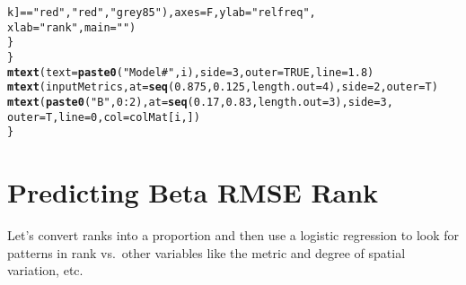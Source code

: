 \documentclass{article}\usepackage[]{graphicx}\usepackage[]{color}
\makeatletter
\newcommand{\hlnum}[1]{\textcolor[rgb]{0.686,0.059,0.569}{#1}}%
\newcommand{\hlstr}[1]{\textcolor[rgb]{0.192,0.494,0.8}{#1}}%
\newcommand{\hlopt}[1]{\textcolor[rgb]{0,0,0}{#1}}%
\newcommand{\hlstd}[1]{\textcolor[rgb]{0.345,0.345,0.345}{#1}}%
\newcommand{\hlkwc}[1]{\textcolor[rgb]{0.333,0.667,0.333}{#1}}%
\newcommand{\hlkwd}[1]{\textcolor[rgb]{0.737,0.353,0.396}{\textbf{#1}}}%
\newenvironment{kframe}{%
 \def\at@end@of@kframe{}%
 \ifinner\ifhmode%
  \def\at@end@of@kframe{\end{minipage}}%
  \begin{minipage}{\columnwidth}%
 \fi\fi%
 \def\FrameCommand##1{\hskip\@totalleftmargin \hskip-\fboxsep
 \colorbox{shadecolor}{##1}\hskip-\fboxsep
     \hskip-\linewidth \hskip-\@totalleftmargin \hskip\columnwidth}%
 \MakeFramed {\advance\hsize-\width
   \@totalleftmargin\z@ \linewidth\hsize
   \@setminipage}}%
 {\par\unskip\endMakeFramed%
 \at@end@of@kframe}
\newenvironment{knitrout}{}{} %
\makeatother
\begin{document}
\begin{knitrout}
\begin{kframe}
\begin{alltt}
                \hlstd{k]} \hlopt{==} \hlstr{"red"}\hlstd{,} \hlstr{"red"}\hlstd{,} \hlstr{"grey85"}\hlstd{),} \hlkwc{axes} \hlstd{= F,} \hlkwc{ylab} \hlstd{=} \hlstr{"rel freq"}\hlstd{,}
                \hlkwc{xlab} \hlstd{=} \hlstr{"rank"}\hlstd{,} \hlkwc{main} \hlstd{=} \hlstr{""}\hlstd{)}
        \hlstd{\}}
    \hlstd{\}}
    \hlkwd{mtext}\hlstd{(}\hlkwc{text} \hlstd{=} \hlkwd{paste0}\hlstd{(}\hlstr{"Model #"}\hlstd{, i),} \hlkwc{side} \hlstd{=} \hlnum{3}\hlstd{,} \hlkwc{outer} \hlstd{=} \hlnum{TRUE}\hlstd{,} \hlkwc{line} \hlstd{=} \hlnum{1.8}\hlstd{)}
    \hlkwd{mtext}\hlstd{(inputMetrics,} \hlkwc{at} \hlstd{=} \hlkwd{seq}\hlstd{(}\hlnum{0.875}\hlstd{,} \hlnum{0.125}\hlstd{,} \hlkwc{length.out} \hlstd{=} \hlnum{4}\hlstd{),} \hlkwc{side} \hlstd{=} \hlnum{2}\hlstd{,} \hlkwc{outer} \hlstd{= T)}
    \hlkwd{mtext}\hlstd{(}\hlkwd{paste0}\hlstd{(}\hlstr{"B"}\hlstd{,} \hlnum{0}\hlopt{:}\hlnum{2}\hlstd{),} \hlkwc{at} \hlstd{=} \hlkwd{seq}\hlstd{(}\hlnum{0.17}\hlstd{,} \hlnum{0.83}\hlstd{,} \hlkwc{length.out} \hlstd{=} \hlnum{3}\hlstd{),} \hlkwc{side} \hlstd{=} \hlnum{3}\hlstd{,}
        \hlkwc{outer} \hlstd{= T,} \hlkwc{line} \hlstd{=} \hlnum{0}\hlstd{,} \hlkwc{col} \hlstd{= colMat[i, ])}
\hlstd{\}}
\end{alltt}
\end{kframe}








\end{knitrout}


\section{Predicting Beta RMSE Rank}

Let's convert ranks into a proportion and then use a logistic regression to look for patterns in rank vs.\ other variables like the metric and degree of spatial variation, etc.
\end{document}
